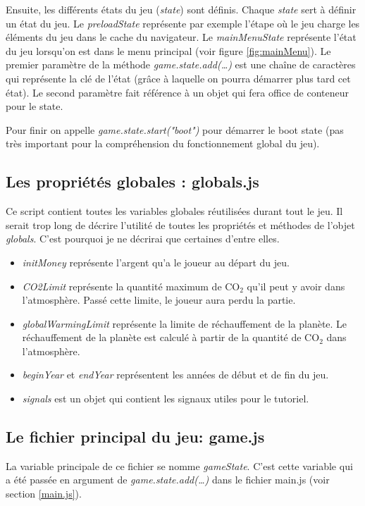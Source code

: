 \documentclass{article}
\begin{document}
		
		Ensuite, les différents états du jeu (\textit{state}) sont définis. Chaque \textit{state} sert à définir un état du jeu. Le \textit{preloadState} représente par exemple l'étape où le jeu charge les éléments du jeu dans le cache du navigateur.
		Le \textit{mainMenuState} représente l'état du jeu lorsqu'on est dans le menu principal (voir figure \ref{fig:mainMenu}).
		Le premier paramètre de la méthode \textit{game.state.add(\dots)} est une chaîne de caractères qui représente la clé de l'état (grâce à laquelle on pourra démarrer plus tard cet état). Le second paramètre fait référence à un objet qui fera office de conteneur pour le state.
		
		
		Pour finir on appelle \textit{game.state.start("boot")} pour démarrer le boot state (pas très important pour la compréhension du fonctionnement global du jeu).
		
		\subsection{Les propriétés globales : globals.js} \label{globals.js}
		
		Ce script contient toutes les variables globales réutilisées durant tout le jeu. Il serait trop long de décrire l'utilité de toutes les propriétés et méthodes de l'objet \textit{globals}. C'est pourquoi je ne décrirai que certaines d'entre elles.
		
		\begin{itemize}
			\item \textit{initMoney} représente l'argent qu'a le joueur au départ du jeu.
			\item \textit{CO2Limit} représente la quantité maximum de CO$_{2}$ qu'il peut y avoir dans l'atmosphère. Passé cette limite, le joueur aura perdu la partie.
			\item \textit{globalWarmingLimit} représente la limite de réchauffement de la planète. Le réchauffement de la planète est calculé à partir de la quantité de CO$_{2}$ dans l'atmosphère.
			\item \textit{beginYear} et \textit{endYear} représentent les années de début et de fin du jeu.
			\item \textit{signals} est un objet qui contient les signaux utiles pour le tutoriel.
		\end{itemize}
		
		\subsection{Le fichier principal du jeu: game.js}
		
		La variable principale de ce fichier se nomme \textit{gameState}. C'est cette variable qui a été passée en argument de \textit{game.state.add(\dots)} dans le fichier main.js (voir section \ref{main.js}).
		
\end{document}
